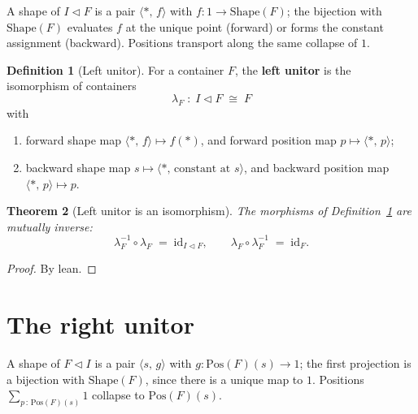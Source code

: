 \documentclass[11pt,a4paper]{article}
\theoremstyle{plain}
\newtheorem{theorem}{Theorem}[section]
\theoremstyle{definition}
\newtheorem{definition}[theorem]{Definition}
\newcommand{\Shape}{\mathrm{Shape}}
\newcommand{\Pos}{\mathrm{Pos}}
\newcommand{\id}{\mathrm{id}}
\newcommand{\compop}{\mathbin{\triangleleft}}
\begin{document}
A shape of $I\compop F$ is a pair $\langle \ast,\, f\rangle$ with
$f:1\to\Shape(F)$; the bijection with $\Shape(F)$ evaluates $f$ at the unique
point (forward) or forms the constant assignment (backward). Positions
transport along the same collapse of $1$.

\begin{definition}[Left unitor]\label{def:left-unitor}
For a container $F$, the \textbf{left unitor} is the isomorphism of containers
\begin{equation}
  \lambda_F \;:\; I\compop F \;\cong\; F
\end{equation}
with
\begin{enumerate}
  \item forward shape map $\langle\ast,\,f\rangle\mapsto f(\ast)$, and
        forward position map $p\mapsto\langle\ast,\,p\rangle$;
  \item backward shape map $s\mapsto\langle\ast,\,\text{constant at }s\rangle$,
        and backward position map $\langle\ast,\,p\rangle\mapsto p$.
\end{enumerate}
\end{definition}

\begin{theorem}[Left unitor is an isomorphism]\label{thm:left-unitor}
The morphisms of Definition~\ref{def:left-unitor} are mutually inverse:
\begin{equation}
  \lambda_F^{-1}\circ\lambda_F \;=\; \id_{I\compop F},
  \qquad
  \lambda_F\circ\lambda_F^{-1} \;=\; \id_F.
\end{equation}
\end{theorem}

\begin{proof}
By lean.
\end{proof}

\section{The right unitor}

A shape of $F\compop I$ is a pair $\langle s,\,g\rangle$ with
$g:\Pos(F)(s)\to 1$; the first projection is a bijection with $\Shape(F)$,
since there is a unique map to $1$. Positions
$\sum_{p\,:\,\Pos(F)(s)}1$ collapse to $\Pos(F)(s)$.
\end{document}
